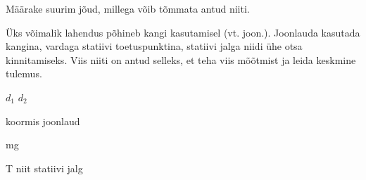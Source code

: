 
Määrake suurim jõud, millega võib tõmmata antud niiti.

\hint

\solu
Üks võimalik lahendus põhineb kangi kasutamisel (vt. joon.). Joonlauda kasutada kangina, vardaga statiivi toetuspunktina, statiivi jalga niidi ühe otsa kinnitamiseks. Viis niiti on antud selleks, et teha viis mõõtmist ja leida keskmine tulemus.

$d_1$ $d_2$

koormis joonlaud

mg

T niit statiivi jalg
\probend
